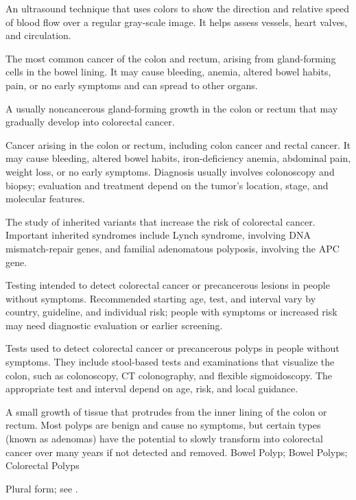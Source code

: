  An ultrasound technique that uses colors to show the direction and relative speed of blood flow over a regular gray-scale image. It helps assess vessels, heart valves, and circulation.

 The most common cancer of the colon and rectum, arising from gland-forming cells in the bowel lining. It may cause bleeding, anemia, altered bowel habits, pain, or no early symptoms and can spread to other organs.

 A usually noncancerous gland-forming growth in the colon or rectum that may gradually develop into colorectal cancer.

 Cancer arising in the colon or rectum, including colon cancer and rectal cancer. It may cause bleeding, altered bowel habits, iron-deficiency anemia, abdominal pain, weight loss, or no early symptoms. Diagnosis usually involves colonoscopy and biopsy; evaluation and treatment depend on the tumor's location, stage, and molecular features.

 The study of inherited variants that increase the risk of colorectal cancer.
Important inherited syndromes include Lynch syndrome, involving DNA mismatch-repair genes, and familial adenomatous
polyposis, involving the APC gene.

 Testing intended to detect colorectal
cancer or precancerous lesions in people without symptoms. Recommended starting
age, test, and interval vary by country, guideline, and individual risk; people
with symptoms or increased risk may need diagnostic evaluation or earlier
screening.

 Tests used to detect colorectal cancer or precancerous polyps in people
without symptoms. They include stool-based tests and examinations that visualize the colon, such as colonoscopy, CT
colonography, and flexible sigmoidoscopy. The appropriate test and interval depend on age, risk, and local guidance.

 A small growth of tissue that protrudes from the inner lining of the colon or rectum. Most polyps are benign and cause no symptoms, but certain types (known as adenomas) have the potential to slowly transform into colorectal cancer over many years if not detected and removed.
\synonyms
Bowel Polyp; Bowel Polyps; Colorectal Polyps

 Plural form; see .

